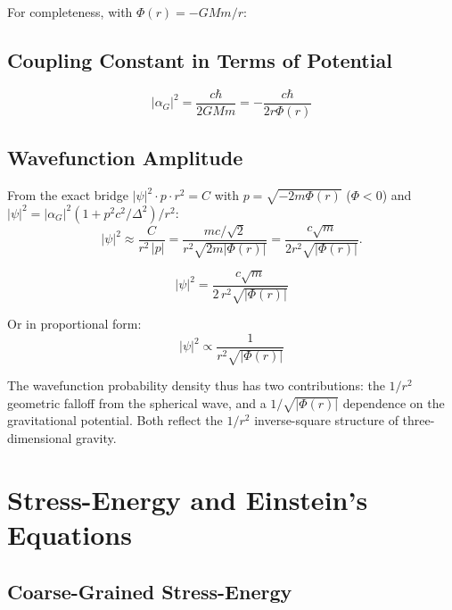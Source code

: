 \documentclass[11pt,a4paper]{article}
\theoremstyle{definition}
\theoremstyle{remark}
\begin{document}
	For completeness, with $\Phi(r)=-GMm/r$:
	
	\subsection{Coupling Constant in Terms of Potential}
	
	\begin{equation}
		|\alpha_G|^2 = \frac{c\hbar}{2GMm} = -\frac{c\hbar}{2r\Phi(r)}
	\end{equation}
	
	\subsection{Wavefunction Amplitude}
	
	From the exact bridge $|\psi|^2 \cdot p \cdot r^2 = C$ with $p=\sqrt{-2m\Phi(r)}$ ($\Phi<0$) and $|\psi|^2 = |\alpha_G|^2(1+p^2c^2/\Delta^2)/r^2$:
	\begin{equation}
		|\psi|^2 \approx \frac{C}{r^2\,|p|} = \frac{mc/\sqrt{2}}{r^2\sqrt{2m|\Phi(r)|}} = \frac{c\sqrt{m}}{2r^2\sqrt{|\Phi(r)|}}.
	\end{equation}
	
	\begin{equation}
		\boxed{|\psi|^2 = \frac{c\sqrt{m}}{2\,r^2\sqrt{|\Phi(r)|}}}
	\end{equation}
	
	Or in proportional form:
	\begin{equation}
		\boxed{|\psi|^2 \propto \frac{1}{r^2\sqrt{|\Phi(r)|}}}
	\end{equation}
	
	The wavefunction probability density thus has two contributions: the $1/r^2$ geometric falloff from the spherical wave, and a $1/\sqrt{|\Phi(r)|}$ dependence on the gravitational potential.  Both reflect the $1/r^2$ inverse-square structure of three-dimensional gravity.
	
	\section{Stress-Energy and Einstein's Equations}
	
	\subsection{Coarse-Grained Stress-Energy}
	
\end{document}
